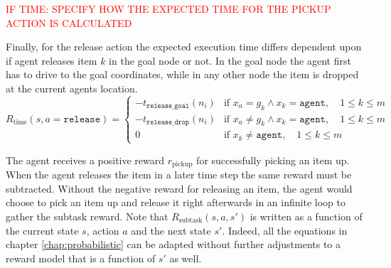 \textcolor{red}{IF TIME: SPECIFY HOW THE EXPECTED TIME FOR THE PICKUP ACTION IS CALCULATED}



Finally, for the release action the expected execution time differs dependent upon if agent releases item $k$ in the goal node or not. In the goal node the agent first has to drive to the goal coordinates, while in any other node the item is dropped at the current agents location. 
\begin{equation}
     R_\text{time}(s, a=\texttt{release}) = \begin{cases}
    -t_\texttt{release\_goal}(n_i) & \text{if }x_a=g_k \land x_k=\texttt{agent}, \quad 1 \leq k \leq m \\
    -t_\texttt{release\_drop}(n_i) & \text{if }x_a\neq g_k \land x_k=\texttt{agent}, \quad 1 \leq k \leq m\\
    0 & \text{if }x_k \neq \texttt{agent}, \quad 1 \leq k \leq m
    \end{cases}
\end{equation}

The agent receives a positive reward $r_\text{pickup}$ for successfully picking an item up. When the agent releases the item in a later time step the same reward must be subtracted. Without the negative reward for releasing an item, the agent would choose to pick an item up and release it right afterwards in an infinite loop to gather the subtask reward. Note that $R_\text{subtask}(s,a,s')$ is written as a function of the current state $s$, action $a$ and the next state $s'$. Indeed, all the equations in chapter \ref{chap:probabilistic} can be adapted without further adjustments to a reward model that is a function of $s'$ as well. 
 
